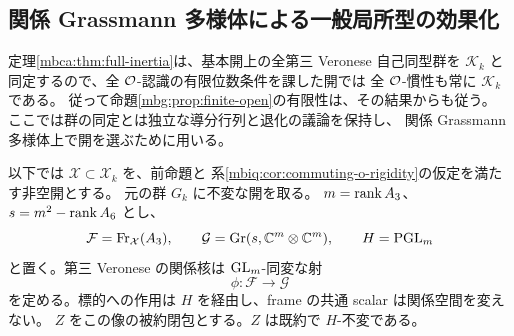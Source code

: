 \subsection{関係 Grassmann 多様体による一般局所型の効果化}

定理\ref{mbca:thm:full-inertia}は、基本開上の全第三 Veronese 自己同型群を
$\mathcal K_k$ と同定するので、全 $\mathcal O$-認識の有限位数条件を課した開では
全 $\mathcal O$-慣性も常に $\mathcal K_k$ である。
従って命題\ref{mbg:prop:finite-open}の有限性は、その結果からも従う。
ここでは群の同定とは独立な導分行列と退化の議論を保持し、
関係 Grassmann 多様体上で開を選ぶために用いる。

以下では $\mathcal X\subset\mathcal X_k$ を、前命題と
系\ref{mbiq:cor:commuting-o-rigidity}の仮定を満たす非空開とする。
元の群 $G_k$ に不変な開を取る。
$m=\operatorname{rank} A_3$、$s=m^2-\operatorname{rank} A_6$ とし、
\[
 \mathcal F=\operatorname{Fr}_{\mathcal X}(A_3),\qquad
 \mathcal G=\operatorname{Gr}(s,\mathbb C^m\otimes\mathbb C^m),\qquad H=\operatorname{PGL}_m
\]
と置く。第三 Veronese の関係核は $\operatorname{GL}_m$-同変な射
\begin{equation}\label{mbg:eq:relation-map}
 \phi:\mathcal F\longrightarrow\mathcal G
\end{equation}
を定める。標的への作用は $H$ を経由し、frame の共通 scalar は関係空間を変えない。
$Z$ をこの像の被約閉包とする。$Z$ は既約で $H$-不変である。

